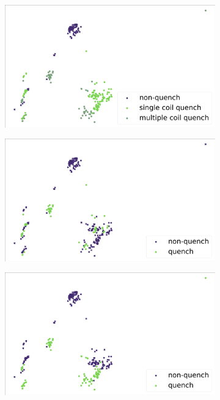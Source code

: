 \begin{figure}[!h]
	\centering
	\begin{subfigure}{\linewidth}
		\includegraphics[width=\linewidth]{img/quench_dist_qlp/single_vs_multiple_Cnmod.png}
		\subcaption{}
	\end{subfigure}
	\begin{subfigure}{0.49\linewidth}
		\includegraphics[width=\linewidth]{img/quench_dist_qlp/quenches_coil_0_Cnmod.png}
		\subcaption{}
	\end{subfigure}
	\begin{subfigure}{0.49\linewidth}
		\includegraphics[width=\linewidth]{img/quench_dist_qlp/quenches_coil_1_Cnmod.png}

\end{subfigure}
\end{figure}
